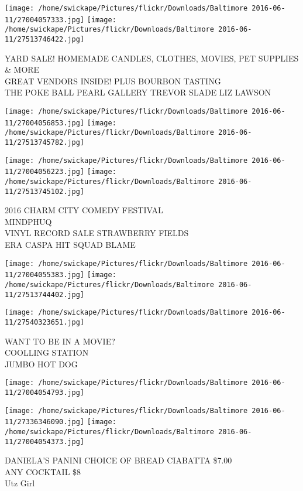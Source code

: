 \documentclass[10pt,letterpaper]{article}
\begin{document}
\vspace{0.25in}
\texttt{[image: /home/swickape/Pictures/flickr/Downloads/Baltimore 2016-06-11/27004057333.jpg]}
\texttt{[image: /home/swickape/Pictures/flickr/Downloads/Baltimore 2016-06-11/27513746422.jpg]}

YARD SALE!  HOMEMADE CANDLES, CLOTHES, MOVIES, PET SUPPLIES \& MORE\\
GREAT VENDORS INSIDE!  PLUS BOURBON TASTING\\
THE POKE BALL PEARL GALLERY TREVOR SLADE LIZ LAWSON
\pagebreak

\texttt{[image: /home/swickape/Pictures/flickr/Downloads/Baltimore 2016-06-11/27004056853.jpg]}
\texttt{[image: /home/swickape/Pictures/flickr/Downloads/Baltimore 2016-06-11/27513745782.jpg]}

\texttt{[image: /home/swickape/Pictures/flickr/Downloads/Baltimore 2016-06-11/27004056223.jpg]}
\texttt{[image: /home/swickape/Pictures/flickr/Downloads/Baltimore 2016-06-11/27513745102.jpg]}

2016 CHARM CITY COMEDY FESTIVAL\\
MINDPHUQ\\
VINYL RECORD SALE STRAWBERRY FIELDS\\
ERA CASPA HIT SQUAD BLAME
\pagebreak

\texttt{[image: /home/swickape/Pictures/flickr/Downloads/Baltimore 2016-06-11/27004055383.jpg]}
\texttt{[image: /home/swickape/Pictures/flickr/Downloads/Baltimore 2016-06-11/27513744402.jpg]}

\vspace{0.25in}
\texttt{[image: /home/swickape/Pictures/flickr/Downloads/Baltimore 2016-06-11/27540323651.jpg]}

WANT TO BE IN A MOVIE?\\
COOLLING STATION\\
JUMBO HOT DOG
\pagebreak

\texttt{[image: /home/swickape/Pictures/flickr/Downloads/Baltimore 2016-06-11/27004054793.jpg]}

\vspace{0.25in}
\texttt{[image: /home/swickape/Pictures/flickr/Downloads/Baltimore 2016-06-11/27336346090.jpg]}
\texttt{[image: /home/swickape/Pictures/flickr/Downloads/Baltimore 2016-06-11/27004054373.jpg]}

DANIELA'S PANINI CHOICE OF BREAD CIABATTA \$7.00\\
ANY COCKTAIL \$8\\
Utz Girl
\pagebreak
\end{document}

